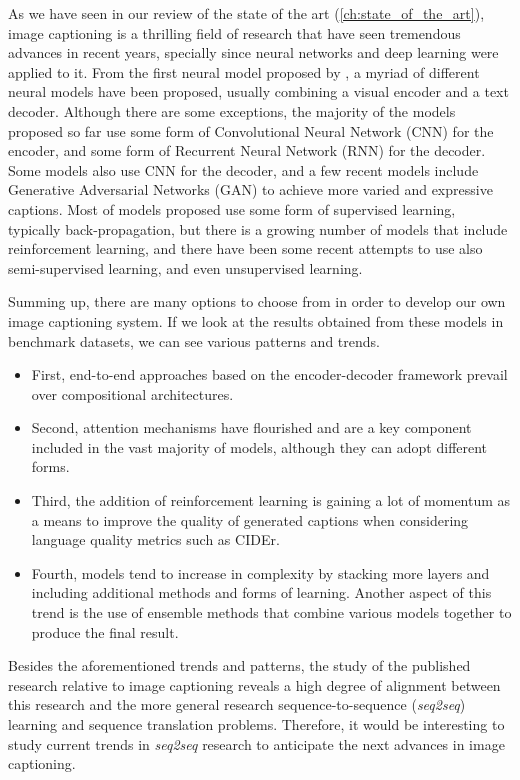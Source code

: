 As we have seen in our review of the state of the art (\cref{ch:state_of_the_art}), image captioning is a thrilling field of research that have seen tremendous advances in recent years, specially since neural networks and deep learning were applied to it. From the first neural model proposed by \citet{Kiros2014_LBL}, a myriad of different neural models have been proposed, usually combining a visual encoder and a text decoder. Although there are some exceptions, the majority of the models proposed so far use some form of Convolutional Neural Network (CNN) for the encoder, and some form of Recurrent Neural Network (RNN) for the decoder. Some models  also use CNN for the decoder, and a few recent models include Generative Adversarial Networks (GAN) to achieve more varied and expressive captions. Most of models proposed use some form of supervised learning, typically back-propagation, but there is a growing number of models that include reinforcement learning, and there have been some recent attempts to use also semi-supervised learning, and even unsupervised learning. 

Summing up, there are many options to choose from in order to develop our own image captioning system. If we look at the results obtained from these models in benchmark datasets, we can see various patterns and trends.

\begin{itemize}
\item First, end-to-end approaches based on the encoder-decoder framework prevail over compositional architectures.
\item Second, attention mechanisms have flourished and are a key component included in the vast majority of models, although they can adopt different forms.
\item Third, the addition of reinforcement learning is gaining a lot of momentum as a means to improve the quality of generated captions when considering language quality metrics such as CIDEr.
\item Fourth, models tend to increase in complexity by stacking more layers and including additional methods and forms of learning. Another aspect of this trend is the use of ensemble methods that combine various models together to produce the final result.
\end{itemize}

Besides the aforementioned trends and patterns, the study of the published research relative to image captioning reveals a 
high degree of alignment between this research and the more general research sequence-to-sequence (\textit{seq2seq}) learning and sequence translation problems. Therefore, it would be interesting to study current trends in \textit{seq2seq} research to anticipate the next advances in image captioning.

